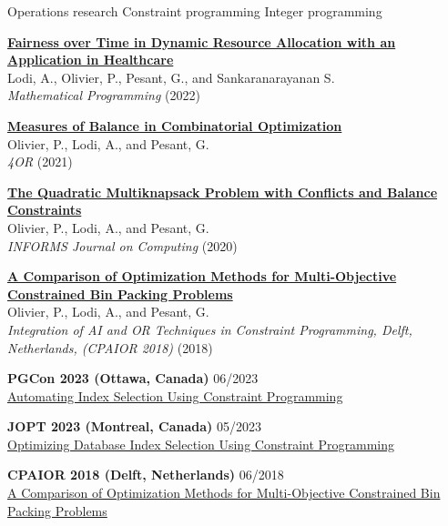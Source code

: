 \documentclass{memoir}
\begin{document}
\begin{list}{}
  \BulletItem Operations research
  \BulletItem Constraint programming
  \BulletItem Integer programming

  

  \Item \href{https://doi.org/10.1007/s10107-022-01904-6}{\textbf{Fairness over Time in Dynamic Resource Allocation with an Application in Healthcare}} \\
  Lodi, A., Olivier, P., Pesant, G., and Sankaranarayanan S. \\
  \emph{Mathematical Programming} (2022)

  \Item \href{https://doi.org/10.1007/s10288-021-00486-x}{\textbf{Measures of Balance in Combinatorial Optimization}} \\
  Olivier, P., Lodi, A., and Pesant, G. \\
  \emph{4OR} (2021)

  \Item \href{https://doi.org/10.1287/ijoc.2020.0983}{\textbf{The Quadratic Multiknapsack Problem with Conflicts and Balance Constraints}} \\
  Olivier, P., Lodi, A., and Pesant, G. \\
  \emph{INFORMS Journal on Computing} (2020)

  \Item \href{https://doi.org/10.1007/978-3-319-93031-2_33}{\textbf{A Comparison of Optimization Methods for Multi-Objective Constrained Bin Packing Problems}} \\
  Olivier, P., Lodi, A., and Pesant, G. \\
  \emph{Integration of AI and OR Techniques in Constraint Programming, Delft, Netherlands, (CPAIOR 2018)} (2018)


  \Item \textbf{PGCon 2023 (Ottawa, Canada)} \hfill 06/2023 \\
  \href{https://www.pgcon.org/events/pgcon_2023/schedule/session/422-automating-index-selection-using-constraint-programming/}{Automating Index Selection Using Constraint Programming}

  \Item \textbf{JOPT 2023 (Montreal, Canada)} \hfill 05/2023 \\
  \href{https://symposia.cirrelt.ca/CORS-JOPT/fr/schedule?slot_id=2207}{Optimizing Database Index Selection Using Constraint Programming}
  
  \Item \textbf{CPAIOR 2018 (Delft, Netherlands)} \hfill 06/2018 \\
  \href{http://icaps18.icaps-conference.org/schedule}{A Comparison of Optimization Methods for Multi-Objective Constrained Bin Packing Problems}


\end{list}
\end{document}
